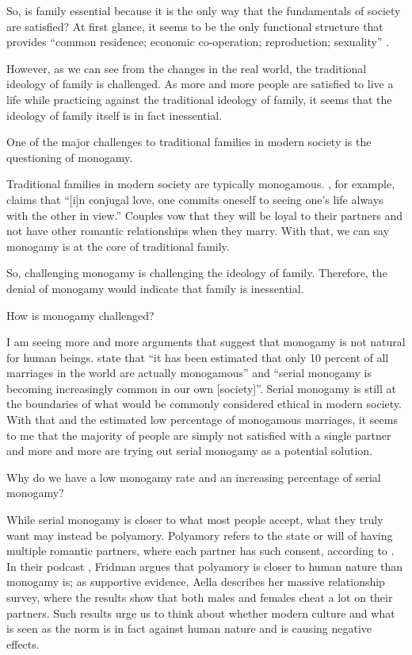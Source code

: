 \documentclass[12pt]{article}
\begin{document}
So, is family essential because it is the only way that the fundamentals of
society are satisfied?
At first glance, it seems to be the only functional structure that provides
``common residence; economic co-operation; reproduction; sexuality''
\citep[p. 60]{gittins1993family}.

However, as we can see from the changes in the real world,
the traditional ideology of family is challenged.
As more and more people are satisfied to live a life while
practicing against the traditional ideology of family,
it seems that the ideology of family itself is in fact inessential.

One of the major challenges to traditional families
in modern society is the questioning of monogamy.

Traditional families in modern society are typically monogamous.
\citet[pp. 4]{schwitzgebel2008thoughts}, for example, claims that
``[i]n conjugal love,
one commits oneself to seeing one's life always with the other in view.''
Couples vow that they will be loyal to their partners and not have other
romantic relationships when they marry.
With that, we can say monogamy is at the core of traditional family.

So, challenging monogamy is challenging the ideology of family.
Therefore, the denial of monogamy would indicate that family is inessential.

How is monogamy challenged?

I am seeing more and more arguments that suggest that monogamy is not natural
for human beings.
\citet[p. 63]{gittins1993family} state that
``it has been estimated that only 10 percent of all
marriages in the world are actually monogamous'' and
``serial monogamy is becoming increasingly common in our own [society]''.
Serial monogamy is still at the boundaries of what would be commonly considered
ethical in modern society.
With that and the estimated low percentage of monogamous marriages,
it seems to me that the majority of people are simply not satisfied with a
single partner and
more and more are trying out serial monogamy as a potential solution.

Why do we have a low monogamy rate and an increasing percentage of serial
monogamy?

While serial monogamy is closer to what most people accept,
what they truly want may instead be polyamory.
Polyamory refers to the state or will of having multiple romantic partners,
where each partner has such consent, according to \cite{wikipedia2023polyamory}.
In their podcast \citep{fridman2023aella},
Fridman argues that polyamory is closer to human nature than monogamy is;
as supportive evidence, Aella describes her massive relationship survey,
where the results show that both males and females cheat a lot on their
partners.
Such results urge us to think about whether modern culture and what is seen as
the norm is in fact against human nature and is causing negative effects.
\end{document}
